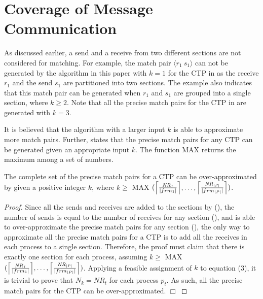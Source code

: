 \section{Coverage of Message Communication}

As discussed earlier, a send and a receive from two different sections are not considered for matching. For example, the match pair  $\langle r_1\ s_1\rangle$ can not be generated by the algorithm in this paper with $k=1$ for the CTP in  as the receive $r_1$ and the send $s_1$ are partitioned into two sections. The example also indicates that this match pair can be generated when $r_1$ and $s_1$ are grouped into a single section, where $k\geq2$.  
Note that all the precise match pairs for the CTP in  are generated with $k=3$.

It is believed that the algorithm with a larger input $k$ is able to approximate more match pairs. Further,  states that the precise match pairs for any CTP can be generated given an appropriate input $k$.
The function $\mathrm{MAX}$ returns the maximum among a set of numbers.
 
\begin{theorem}
The complete set of the precise match pairs for a CTP can be over-approximated by  given a positive integer $k$, where $k \geq$ $\mathrm{MAX}$ $(\ceil*{\frac{\mathit{NR_{1}}}{|frm_1|}},\ldots,\ceil*{\frac{\mathit{NR_{|P|}}}{|frm_{|P|}|}})$.
\label{theorem:precise}
\end{theorem}
\begin{proof}
Since all the sends and receives are added to the sections by  (), the number of sends is equal to the number of receives for any section (), and  is able to over-approximate the precise match pairs for any section (), the only way to approximate all the precise match pairs for a CTP is to add all the receives in each process to a single section. Therefore, the proof must claim that there is exactly one section for each process, assuming $k \geq$ $\mathrm{MAX}$ $(\ceil*{\frac{\mathit{NR_{1}}}{|frm_1|}},\ldots,\ceil*{\frac{\mathit{NR_{|P|}}}{|frm_{|P|}|}})$. Applying a feasible assignment of $k$ to equation (3), it is trivial to prove that $N_k = \mathit{NR_{t}}$ for each process $p_t$. As such, all the precise match pairs for the CTP can be over-approximated.
$\Box$
\end{proof}

